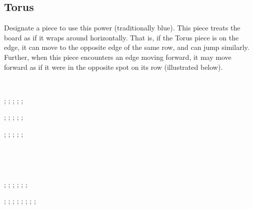 \documentclass[rulebook.tex]{subfiles}
\begin{document}
\subsection*{Torus}
Designate a piece to use this power (traditionally blue).
This piece treats the board as if it wraps around horizontally.
That is, if the Torus piece is on the edge, it can move to the opposite edge of the same row, and can jump similarly.
Further, when this piece encounters an edge moving forward, it may move forward as if it were in the opposite spot on its row (illustrated below).

\

\begin{center}
\begin{struggleboard}
  ;
  ;
  ;
  ;
  ;
\end{struggleboard}
\begin{struggleboard}
  ;
  ;
  ;
  ;
  ;
\end{struggleboard}
\begin{struggleboard}
  ;
  ;
  ;
  ;
  ;
\end{struggleboard}

\

\

\begin{struggleboard}{0.5}
  ;
  ;
  ;
  ;
  ;
  ;
\end{struggleboard}
\quad
\begin{struggleboard}
  ;
  ;
  ;
  ;
  ;
  ;
  ;
  ;
\end{struggleboard}
\end{center}
\end{document}
